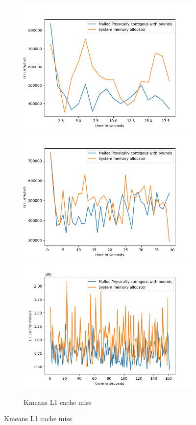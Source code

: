 \begin{figure}
  \begin{subfigure}{\linewidth}
  \includegraphics[width=.5\linewidth]{BenchmarkRuns/Kmeans/ll_kmeans_3_dimentions.png}\hfill
  \includegraphics[width=.5\linewidth]{BenchmarkRuns/Kmeans/ll_kmeans_6_dimentions.png}\hfill
  \includegraphics[width=.5\linewidth]{BenchmarkRuns/Kmeans/ll_tlb_40_dimentions.png}
  \caption{Kmeans L1 cache miss}
\end{subfigure}
\end{figure}

